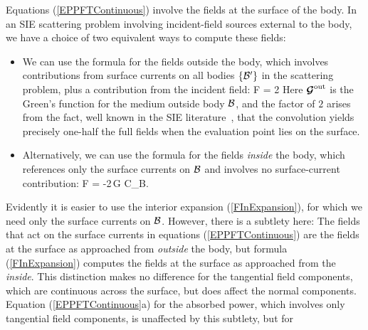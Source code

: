 Equations (\ref{EPPFTContinuous}) involve the fields at the surface
of the body. In an SIE scattering problem involving incident-field 
sources external to the body, we have a choice of two equivalent ways 
to compute these fields:
\begin{itemize}
\item We can use the formula for the fields outside the body, which
involves contributions from surface currents on all bodies
$\{\mathcal{B}^\prime\}$ in the scattering problem, plus a contribution 
from the incident field:
 {  \bmc F 
    =  2
 }
Here $\boldsymbol{\mathcal{G}}^{\hbox{\scriptsize{out}}}$ is the Green's function for the medium outside
body $\mathcal{B}$, and the factor of $2$ arises from the fact, well known 
in the SIE literature~\cite{Chen1989},
that the convolution yields precisely one-half the full fields when
the evaluation point lies on the surface.
\item Alternatively, we can use the formula for the fields
      \textit{inside} the body, which references only the surface
      currents on $\mathcal{B}$ and involves no surface-current contribution:
 {  \bmc F
     = -2\,\bmc G \star \bmc C_{\mc B}.
 }
\end{itemize}
Evidently it is easier to use the interior expansion (\ref{FInExpansion}),
for which we need only the surface currents on $\mathcal{B}$. However,
there is a subtlety here: The fields that act on the surface currents 
in equations (\ref{EPPFTContinuous}) are the fields at the surface as 
approached from \textit{outside} the body, but formula (\ref{FInExpansion}) 
computes the fields at the surface as approached from the \textit{inside}.
This distinction makes no difference for the tangential field
components, which are continuous across the surface, but
does affect the normal components. Equation (\ref{EPPFTContinuous}a) 
for the absorbed power, which involves only tangential field
components, is unaffected by this subtlety, but for 
